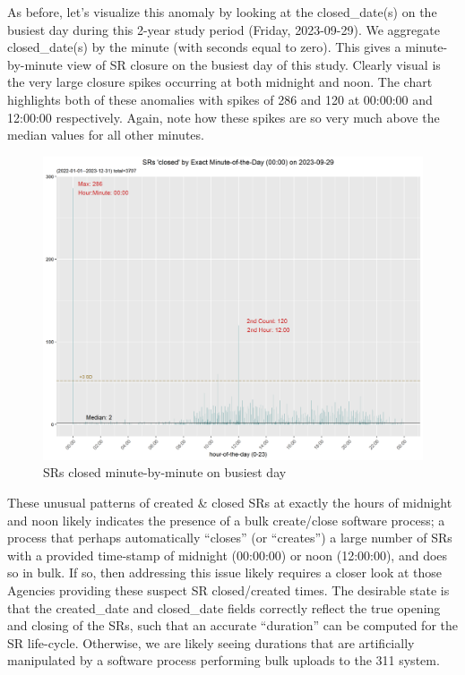 \documentclass[12pt, titlepage]{article}
\begin{document}
{	As before, let's visualize this anomaly by looking at the closed\_date(s) on the busiest day
	during this 2-year study period (Friday, 2023-09-29). We aggregate closed\_date(s) by the
	minute (with seconds equal to zero). This gives a minute-by-minute view of SR closure
	on the busiest day of this study. Clearly visual is the very large closure spikes occurring
	at both midnight and noon. The chart highlights both of these anomalies with spikes
	of 286 and 120 at 00:00:00 and 12:00:00 respectively. Again, note how these spikes
	are so very much above the median values for all other minutes.

 	\begin{figure}[H]
		 \centering
		 \includegraphics[width=\textwidth]{SR_closed_by_minute_of_busiest_day.png}
		 \caption{SRs closed minute-by-minute on busiest day}
		 \label{fig:busiestclosed}
	\end{figure}	

	These unusual patterns of created \& closed SRs at exactly the hours of midnight and noon likely indicates
	the presence of a bulk create/close software process; a process that perhaps automatically ``closes'' (or ``creates'') 
	a large number of SRs with a provided time-stamp of midnight (00:00:00) or noon (12:00:00), and does so in bulk. 
	If so, then addressing this issue likely requires a closer look at those Agencies providing these suspect SR closed/created times.
	 The desirable state is that the created\_date and closed\_date fields correctly reflect the true opening and closing 
	 of the SRs, such that an accurate ``duration'' can be computed for the SR life-cycle. Otherwise, we are likely seeing 
	 durations that are artificially manipulated by a software process performing bulk uploads to the 311 system.

}
\end{document}
